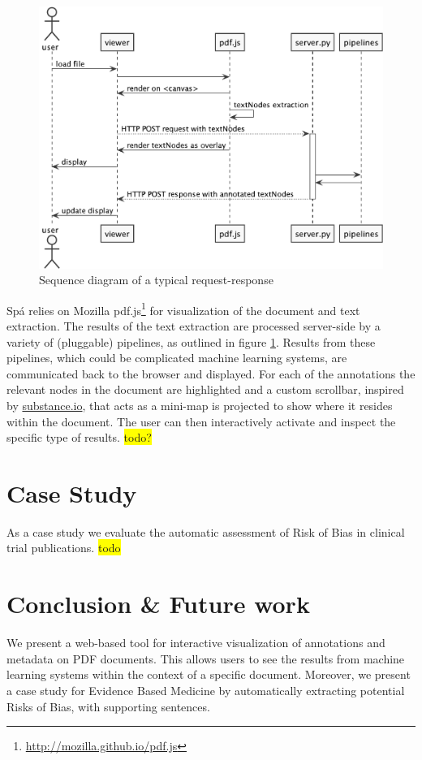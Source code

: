 \documentclass[runningheads,a4paper]{llncs}
\newcommand{\highlight}[1]{\colorbox{yellow}{#1}}
\begin{document}
\begin{figure}[htb]
\centering
\includegraphics[width=.9\linewidth]{diagrams/sequence-eps-converted-to.pdf}
\caption{\label{fig:sequence}Sequence diagram of a typical request-response}
\end{figure}

Sp{\'a} relies on Mozilla pdf.js\footnote{\url{http://mozilla.github.io/pdf.js}} for visualization of the document and text extraction.
The results of the text extraction are processed server-side by a variety of (pluggable) pipelines, as outlined in figure \ref{fig:sequence}.
Results from these pipelines, which could be complicated machine learning systems, are communicated back to the browser and displayed.
For each of the annotations the relevant nodes in the document are highlighted and a custom scrollbar, inspired by \href{http://substance.io/}{substance.io}, that acts as a mini-map is projected to show where it resides within the document.
The user can then interactively activate and inspect the specific type of results.
\highlight{todo?}
\section{Case Study}
\label{sec-3}
As a case study we evaluate the automatic assessment of Risk of Bias in clinical trial publications.
\highlight{todo}
\section{Conclusion \& Future work}
\label{sec-4}
We present a web-based tool for interactive visualization of annotations and metadata on PDF documents.
This allows users to see the results from machine learning systems within the context of a specific document.
Moreover, we present a case study for Evidence Based Medicine by automatically extracting potential Risks of Bias, with supporting sentences.
\end{document}
